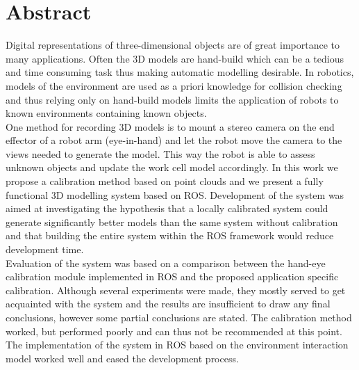 \chapter*{Abstract}
Digital representations of three-dimensional objects are of great importance to many applications. Often the 3D models are hand-build which can be a tedious and time consuming task thus making automatic modelling desirable. In robotics, models of the environment are used as a priori knowledge for collision checking and thus relying only on hand-build models limits the application of robots to known environments containing known objects. \\

One method for recording 3D models is to mount a stereo camera on the end effector of a robot arm (eye-in-hand) and let the robot move the camera to the views needed to generate the model. This way the robot is able to assess unknown objects and update the work cell model accordingly. In this work we propose a calibration method based on point clouds and we present a fully functional 3D modelling system based on ROS. Development of the system was aimed at investigating the hypothesis that a locally calibrated system could generate significantly better models than the same system without calibration and that building the entire system within the ROS framework would reduce development time. \\

Evaluation of the system was based on a comparison between the hand-eye calibration module implemented in ROS and the proposed application specific calibration. Although several experiments were made, they mostly served to get acquainted with the system and the results are insufficient to draw any final conclusions, however some partial conclusions are stated. The calibration method worked, but performed poorly and can thus not be recommended at this point. The implementation of the system in ROS based on the environment interaction model worked well and eased the development process. \\